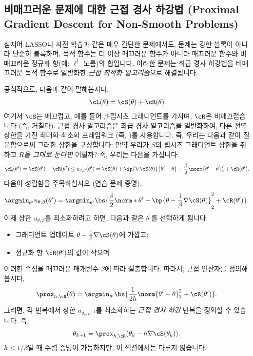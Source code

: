 \documentclass[../../book-main_ko.tex]{subfiles}
\begin{document}
\subsection{비매끄러운 문제에 대한 근접 경사 하강법 (Proximal Gradient Descent for Non-Smooth Problems)}\label{subsec:pgd}

심지어 LASSO나 사전 학습과 같은 매우 간단한 문제에서도, 문제는 강한 볼록이 아니라 단순히 볼록하며, 목적 함수는 더 이상 매끄러운 함수가 아니라 매끄러운 함수와 비매끄러운 정규화 항(예: \(\ell^{1}\) 노름)의 합입니다. 이러한 문제는 최급 경사 하강법을 비매끄러운 목적 함수로 일반화한 \textit{근접 최적화 알고리즘}으로 해결됩니다.

공식적으로, 다음과 같이 말해봅시다.
\begin{equation}
    \cL(\theta) \doteq \cS(\theta) + \cR(\theta)
\end{equation}
여기서 \(\cS\)는 매끄럽고, 예를 들어 \(\beta\)-립시츠 그래디언트를 가지며, \(\cR\)은 비매끄럽습니다 (즉, 거칠다). 근접 경사 알고리즘은 최급 경사 알고리즘을 일반화하여, 다른 전역 상한을 가진 최대화-최소화 프레임워크 (즉, )를 사용합니다. 즉, 우리는 다음과 같이 질문함으로써 그러한 상한을 구성합니다: 만약 우리가 \(S\)의 립시츠 그래디언트 상한을 취하고 \textit{\(R\)을 그대로 둔다면} 어떨까? 즉, 우리는 다음을 가집니다.
\begin{equation}
    \cL(\theta^{\prime}) = \cS(\theta^{\prime}) + \cR(\theta^{\prime}) \leq u_{\theta, \beta}(\theta^{\prime}) \doteq \cS(\theta) + \ip{\nabla \cS(\theta)}{\theta^{\prime} - \theta} + \frac{\beta}{2}\norm{\theta^{\prime} - \theta}_{2}^{2} + \cR(\theta^{\prime}).
\end{equation}
다음이 성립함을 주목하십시오 (연습 문제 증명).
\begin{equation}
    \argmin_{\theta^{\prime}}u_{\theta, \beta}(\theta^{\prime}) = \argmin_{\theta^{\prime}}\bs{\frac{\beta}{2}\norm*{\theta^{\prime} - \bp{\theta - \frac{1}{\beta}\nabla \cS(\theta)}}_{2}^{2} + \cR(\theta^{\prime})}.
\end{equation}
이제 상한 \(u_{\theta, \beta}\)를 최소화하려고 하면, 다음과 같은 \(\theta^{\prime}\)를 선택하게 됩니다:
\begin{itemize}
    \item 그래디언트 업데이트 \(\theta - \frac{1}{\beta}\nabla \cS(\theta)\)에 가깝고;
    \item 정규화 항 \(\cR(\theta^{\prime})\)의 값이 작으며
\end{itemize}
이러한 속성을 매끄러움 매개변수 \(\beta\)에 따라 절충합니다. 따라서, 근접 연산자를 정의해 봅시다.
\begin{equation}
    \prox_{h, \cR}(\theta) \doteq \argmin_{\theta^{\prime}}\bs{\frac{1}{2h}\norm{\theta^{\prime} - \theta}_{2}^{2} + \cR(\theta^{\prime})}.
\end{equation}
그러면, 각 반복에서 상한 \(u_{\theta_{k}, h^{-1}}\)를 최소화하는 \textit{근접 경사 하강} 반복을 정의할 수 있습니다. 즉,
\begin{equation}
    \theta_{k + 1} = \prox_{h, \cR}(\theta_{k} - h\nabla \cS(\theta_{k})).
\end{equation}
\(h \leq 1/\beta\)일 때 수렴 증명이 가능하지만, 이 섹션에서는 다루지 않습니다.
\end{document}
